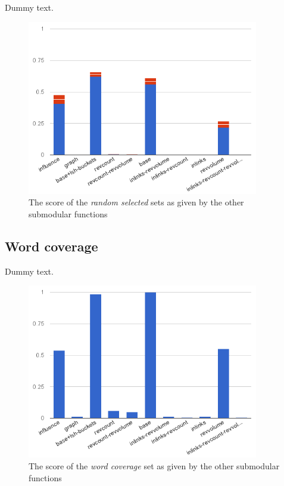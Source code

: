 Dummy text.
\begin{figure}
  \centering
  \includegraphics[width=0.9\textwidth,natwidth=555,natheight=419]{images/rand-mean.png}
  \caption{The score of the \emph{random selected} sets as given by the other
  submodular functions}
  \label{img:rand-mean}
\end{figure}

\subsection{Word coverage}

Dummy text.
\begin{figure}
  \centering
  \includegraphics[width=0.9\textwidth,natwidth=555,natheight=419]{images/wc.png}
  \caption{The score of the \emph{word coverage} set as given by the other
  submodular functions}
  \label{img:wc}
\end{figure}

